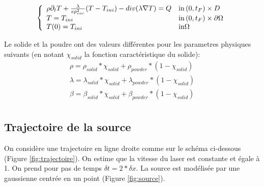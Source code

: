 \documentclass[11pt,a4paper]{article}
\begin{document}
\begin{equation}
\label{eq:heatEq}
\left\{\begin{array}{ll}
\rho\partial_t T+\frac{\lambda}{ep_{car}^2}(T-T_{ini}) -div(\lambda\nabla T)=Q & \textrm{in\,}(0,t_F)\times D \\
T=T_{ini} & \textrm{in\,}(0,t_F)\times \partial\Omega \\
T(0)=T_{ini} & \textrm{in} \Omega
\end{array}\right.
\end{equation}

Le solide et la poudre ont des valeurs différentes pour les parametres physiques suivants (en notant $\chi_{solid}$ la fonction caractéristique du solide):
\begin{equation}
\begin{aligned}
\rho=\rho_{solid}*\chi_{solid}+\rho_{powder}*(1-\chi_{solid}) \\
\lambda=\lambda_{solid}*\chi_{solid}+\lambda_{powder}*(1-\chi_{solid}) \\
\beta=\beta_{solid}*\chi_{solid}+\beta_{powder}*(1-\chi_{solid}) \\
\end{aligned}
\end{equation}

\subsection*{Trajectoire de la source}
On considère une trajectoire en ligne droite comme sur le schéma ci-dessous (Figure \ref{fig:trajectoire}). On estime que la vitesse du laser est constante et égale à 1. On prend pour pas de temps $\delta t=2*\delta x$. La source est modélisée par une gaussienne centrée en un point (Figure \ref{fig:source}). 
\end{document}

